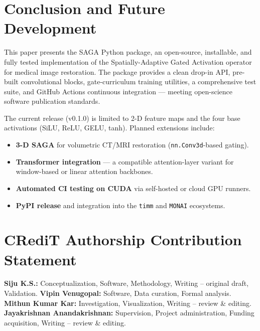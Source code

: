\documentclass[preprint,12pt]{elsarticle}
\begin{document}
\section{Conclusion and Future Development}
\label{sec:conclusion}

This paper presents the SAGA Python package, an open-source, installable,
and fully tested implementation of the Spatially-Adaptive Gated Activation
operator for medical image restoration.
The package provides a clean drop-in API, pre-built convolutional blocks,
gate-curriculum training utilities, a comprehensive test suite, and
GitHub Actions continuous integration — meeting open-science software
publication standards.

The current release (v0.1.0) is limited to 2-D feature maps and the four
base activations (SiLU, ReLU, GELU, tanh).
Planned extensions include:

\begin{itemize}
  \item \textbf{3-D SAGA} for volumetric CT/MRI restoration
        (\texttt{nn.Conv3d}-based gating).
  \item \textbf{Transformer integration} — a compatible attention-layer
        variant for window-based or linear attention backbones.
  \item \textbf{Automated CI testing on CUDA} via self-hosted or
        cloud GPU runners.
  \item \textbf{PyPI release} and integration into the
        \texttt{timm} and \texttt{MONAI} ecosystems.
\end{itemize}

\section*{CRediT Authorship Contribution Statement}

\textbf{Siju K.S.:} Conceptualization, Software, Methodology, Writing –
original draft, Validation.
\textbf{Vipin Venugopal:} Software, Data curation, Formal analysis.
\textbf{Mithun Kumar Kar:} Investigation, Visualization, Writing – review
\& editing.
\textbf{Jayakrishnan Anandakrishnan:} Supervision, Project administration,
Funding acquisition, Writing – review \& editing.
\end{document}
